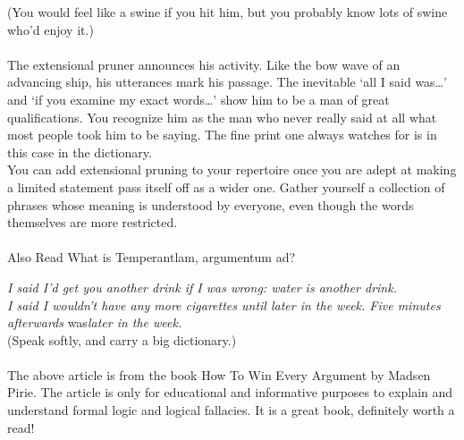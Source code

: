 \documentclass[a4paper,12pt,single,pdftex]{scrartcl}
\begin{document}
    
      (You would feel like a swine if you hit him, but you probably know lots of swine who’d enjoy it.)
    \\

    
       
    \\

    
      The extensional pruner announces his activity. Like the bow wave of an advancing ship, his utterances mark his passage. The inevitable ‘all I said was…’ and ‘if you examine my exact words…’ show him to be a man of great qualifications. You recognize him as the man who never really said at all what most people took him to be saying. The fine print one always watches for is in this case in the dictionary.
    \\

    
      You can add extensional pruning to your repertoire once you are adept at making a limited statement pass itself off as a wider one. Gather yourself a collection of phrases whose meaning is understood by everyone, even though the words themselves are more restricted.
    \\

    
       
    \\

    
      

      
        Also Read  What is Temperantlam, argumentum ad?
      
    
    
      {\em I said I’d get you another drink if I was wrong: water is another drink.}
    \\

    
      {\em I said I wouldn’t have any more cigarettes until later in the week. Five minutes afterwards }was{\em  later in the week.}
    \\

    
      (Speak softly, and carry a big  dictionary.)
    \\

    
       
    \\

    
      The above article is from the book How To Win Every Argument by Madsen Pirie. The article is only for educational and informative purposes to explain and understand formal logic and logical fallacies. It is a great book, definitely worth a read!
    \\
\end{document}
